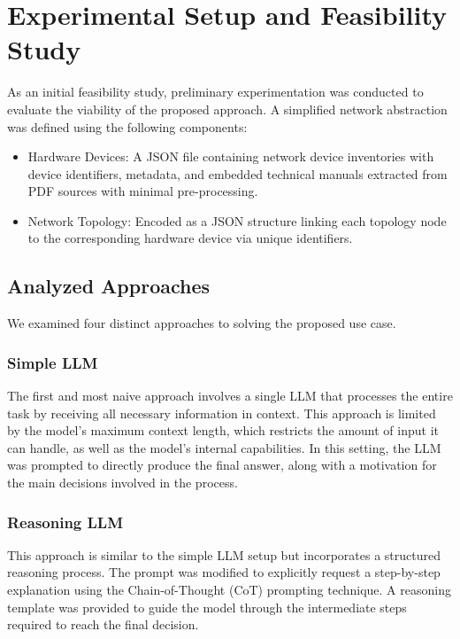 \section{Experimental Setup and Feasibility Study}\label{sec:AI4NE_exp}

As an initial feasibility study, preliminary experimentation was conducted to evaluate the viability of the proposed approach. A simplified network abstraction was defined using the following components:

\begin{itemize}[leftmargin=*, label=--]
    \item Hardware Devices: A JSON file containing network device inventories with device identifiers, metadata, and embedded technical manuals extracted from PDF sources with minimal pre-processing.
    \item Network Topology: Encoded as a JSON structure linking each topology node to the corresponding hardware device via unique identifiers.
\end{itemize}


\subsection{Analyzed Approaches}

We examined four distinct approaches to solving the proposed use case.

\subsubsection{Simple LLM}
The first and most naive approach involves a single LLM that processes the entire task by receiving all necessary information in context. This approach is limited by the model's maximum context length, which restricts the amount of input it can handle, as well as the model's internal capabilities. In this setting, the LLM was prompted to directly produce the final answer, along with a motivation for the main decisions involved in the process.

\subsubsection{Reasoning LLM}
This approach is similar to the simple LLM setup but incorporates a structured reasoning process. The prompt was modified to explicitly request a step-by-step explanation using the Chain-of-Thought (CoT) prompting technique. A reasoning template was provided to guide the model through the intermediate steps required to reach the final decision.

